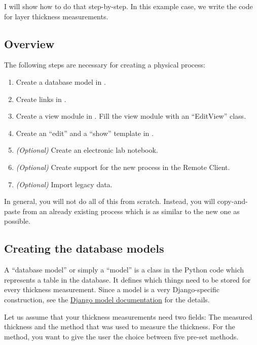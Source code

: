 \documentclass[a4paper,11pt,english]{sphinxmanual}
\begin{document}
I will show how to do that step-by-step.  In this example case, we write the
code for layer thickness measurements.


\subsection{Overview}
\label{programming/programming:overview}
The following steps are necessary for creating a physical process:
\begin{enumerate}
\item {} 
Create a database model in .

\item {} 
Create links in .

\item {} 
Create a view module in .  Fill the view module with an
“EditView” class.

\item {} 
Create an “edit” and a “show” template in .

\item {} 
\emph{(Optional)} Create an electronic lab notebook.

\item {} 
\emph{(Optional)} Create support for the new process in the Remote Client.

\item {} 
\emph{(Optional)} Import legacy data.

\end{enumerate}

In general, you will not do all of this from scratch.  Instead, you will
copy-and-paste from an already existing process which is as similar to the new
one as possible.


\subsection{Creating the database models}
\label{programming/programming:creating-the-database-models}
A “database model” or simply a “model” is a class in the Python code which
represents a table in the database.  It defines which things need to be stored
for every thickness measurement.  Since a model is a very Django-specific
construction, see the \href{https://docs.djangoproject.com/en/dev/topics/db/models/}{Django model documentation} for the details.

Let us assume that your thickness measurements need two fields: The measured
thickness and the method that was used to measure the thickness.  For the
method, you want to give the user the choice between five pre-set methods.
\end{document}
